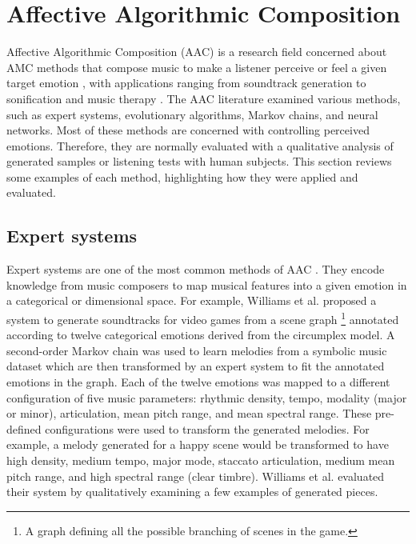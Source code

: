 \section{Affective Algorithmic Composition}

Affective Algorithmic Composition (AAC) is a research field concerned about AMC methods that compose music to make a listener perceive or feel a given target emotion \cite{williams2015investigating}, with applications ranging from soundtrack generation \cite{williams2015dynamic} to sonification \cite{Chen2015} and music therapy \cite{miranda2011brain}. The AAC literature examined various methods, such as expert systems, evolutionary algorithms, Markov chains, and neural networks. Most of these methods are concerned with controlling perceived emotions. Therefore, they are normally evaluated with a qualitative analysis of generated samples or listening tests with human subjects. This section reviews some examples of each method, highlighting how they were applied and evaluated.

\subsection{Expert systems}

Expert systems are one of the most common methods of AAC \cite{williams2015investigating}. They encode knowledge from music composers to map musical features into a given emotion in a categorical or dimensional space. For example, Williams et al. \cite{williams2015dynamic} proposed a system to generate soundtracks for video games from a scene graph \footnote{A graph defining all the possible branching of scenes in the game.} annotated according to twelve categorical emotions derived from the circumplex model. A second-order Markov chain was used to learn melodies from a symbolic music dataset which are then transformed by an expert system to fit the annotated emotions in the graph. Each of the twelve emotions was mapped to a different configuration of five music parameters: rhythmic density, tempo, modality (major or minor), articulation, mean pitch range, and mean spectral range. These pre-defined configurations were used to transform the generated melodies. For example, a melody generated for a happy scene would be transformed to have high density, medium tempo, major mode, staccato articulation, medium mean pitch range, and high spectral range (clear timbre).
Williams et al. \cite{williams2015dynamic} evaluated their system by qualitatively examining a few examples of generated pieces.

